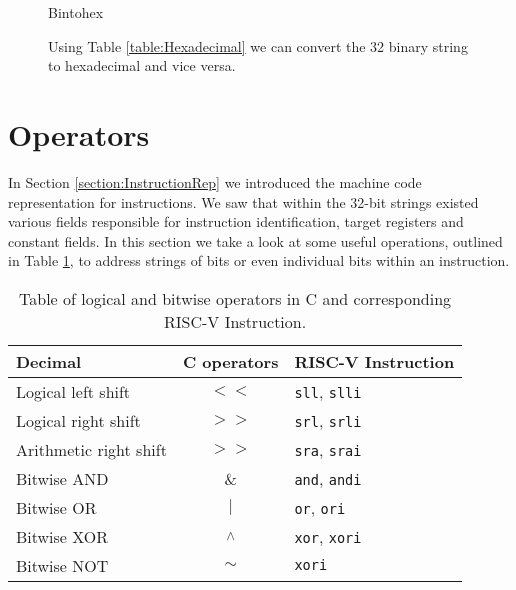             \begin{figure}[h!]
                \centering
                {Bintohex}
                \caption{Using Table \ref{table:Hexadecimal} we can convert the 32 binary string to hexadecimal and vice versa.}
                \label{fig:bintohex}
            \end{figure}
       
\section{Operators}\label{section:Operators}
    In Section \ref{section:InstructionRep} we introduced the machine code representation for instructions. We saw that within the 32-bit strings existed various fields responsible for instruction identification, target registers and constant fields.
    In this section we take a look at some useful operations, outlined in Table \ref{table:operators}, to address strings of bits or even individual bits within an instruction.
    
    \begin{table}[h!]
        \centering
        \begin{tabular}{|l|c|l|}
        	\hline
        	Decimal                & C operators                & RISC-V Instruction          \\ \hline
        	Logical left shift     & $<<$                      & \texttt{sll}, \texttt{slli} \\ \hline
        	Logical right shift    & $>>$                      & \texttt{srl}, \texttt{srli} \\ \hline
        	Arithmetic right shift & $>>$                      & \texttt{sra}, \texttt{srai} \\ \hline
        	Bitwise AND            & \&                         & \texttt{and}, \texttt{andi} \\ \hline
        	Bitwise OR             & $\mid$                     & \texttt{or}, \texttt{ori}   \\ \hline
        	Bitwise XOR            & \textsuperscript{$\wedge$} & \texttt{xor}, \texttt{xori} \\ \hline
        	Bitwise NOT            & $\sim$                     & \texttt{xori}               \\ \hline
        \end{tabular}
        \caption{Table of logical and bitwise operators in C and corresponding RISC-V Instruction.}
        \label{table:operators}
    \end{table}
    
